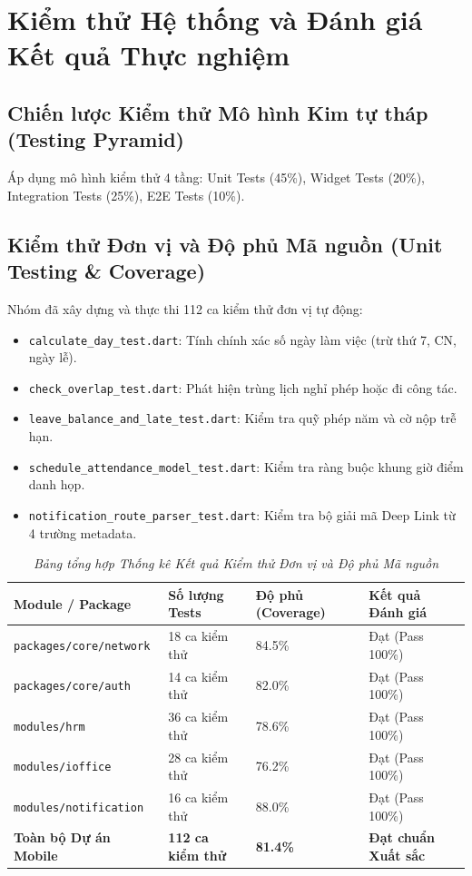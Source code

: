 \section{Kiểm thử Hệ thống và Đánh giá Kết quả Thực nghiệm}
\label{sec:kiemthu_danhgia}

\subsection{Chiến lược Kiểm thử Mô hình Kim tự tháp (Testing Pyramid)}
Áp dụng mô hình kiểm thử 4 tầng: Unit Tests (45\%), Widget Tests (20\%), Integration Tests (25\%), E2E Tests (10\%).

\subsection{Kiểm thử Đơn vị và Độ phủ Mã nguồn (Unit Testing \& Coverage)}
Nhóm đã xây dựng và thực thi 112 ca kiểm thử đơn vị tự động:
\begin{itemize}
    \item \texttt{calculate\_day\_test.dart}: Tính chính xác số ngày làm việc (trừ thứ 7, CN, ngày lễ).
    \item \texttt{check\_overlap\_test.dart}: Phát hiện trùng lịch nghỉ phép hoặc đi công tác.
    \item \texttt{leave\_balance\_and\_late\_test.dart}: Kiểm tra quỹ phép năm và cờ nộp trễ hạn.
    \item \texttt{schedule\_attendance\_model\_test.dart}: Kiểm tra ràng buộc khung giờ điểm danh họp.
    \item \texttt{notification\_route\_parser\_test.dart}: Kiểm tra bộ giải mã Deep Link từ 4 trường metadata.
\end{itemize}

\begin{table}[H]
\centering
\renewcommand{\arraystretch}{1.2}
\begin{tabularx}{\textwidth}{|p{4.5cm}|p{2.5cm}|p{2.5cm}|X|}
\hline
\textbf{Module / Package} & \textbf{Số lượng Tests} & \textbf{Độ phủ (Coverage)} & \textbf{Kết quả Đánh giá} \\
\hline
\texttt{packages/core/network} & 18 ca kiểm thử & 84.5\% & Đạt (Pass 100\%) \\
\hline
\texttt{packages/core/auth} & 14 ca kiểm thử & 82.0\% & Đạt (Pass 100\%) \\
\hline
\texttt{modules/hrm} & 36 ca kiểm thử & 78.6\% & Đạt (Pass 100\%) \\
\hline
\texttt{modules/ioffice} & 28 ca kiểm thử & 76.2\% & Đạt (Pass 100\%) \\
\hline
\texttt{modules/notification} & 16 ca kiểm thử & 88.0\% & Đạt (Pass 100\%) \\
\hline
\textbf{Toàn bộ Dự án Mobile} & \textbf{112 ca kiểm thử} & \textbf{81.4\%} & \textbf{Đạt chuẩn Xuất sắc} \\
\hline
\end{tabularx}
\caption{\textit{Bảng tổng hợp Thống kê Kết quả Kiểm thử Đơn vị và Độ phủ Mã nguồn}}
\label{tab:unit_test_summary}
\end{table}

